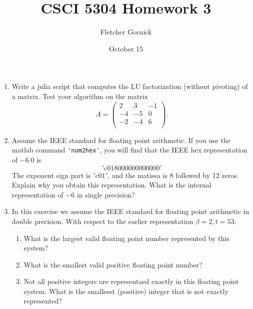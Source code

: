 \documentclass[11pt]{article}
\title{\vspace{-1.0cm}CSCI 5304 Homework 3}
\author{Fletcher Gornick}
\date{October 15}
\begin{document}
\maketitle
\begin{enumerate}
	\item Write a julia script that computes the LU factorization (without pivoting) of a matrix.  Test your algorithm on the matrix
	      \[A = \left(\begin{array}{rrr} 2 & 3 & -1 \\ -4 & -5 & 0 \\ -2 & -4 & 6 \\ \end{array}\right).\]

	\item Assume the IEEE standard for floating point arithmetic.  If you use the matlab command \verb!'num2hex'!, you will find that the IEEE hex representation of \(-6.0\) is
	      \['c018000000000000'\]
	      The exponent sign part is \('c01'\), and the matissa is \(8\) followed by 12 zeros.  Explain why you obtain this representation.  What is the internal representation of \(-6\) in single precision?

	\item In this exercise we assume the IEEE standard for floating point arithmetic in double precision.  With respect to the earlier representation \(\beta = 2, t = 53\).
	      \begin{enumerate}
		      \item What is the largest valid floating point number represented by this system?
		      \item What is the smallest valid positive floating point number?
		      \item Not all positive integers are representaed exactly in this floating point system.  What is the smallesst (positive) integer that is not exactly represented?
	      \end{enumerate}


\end{enumerate}
\end{document}

